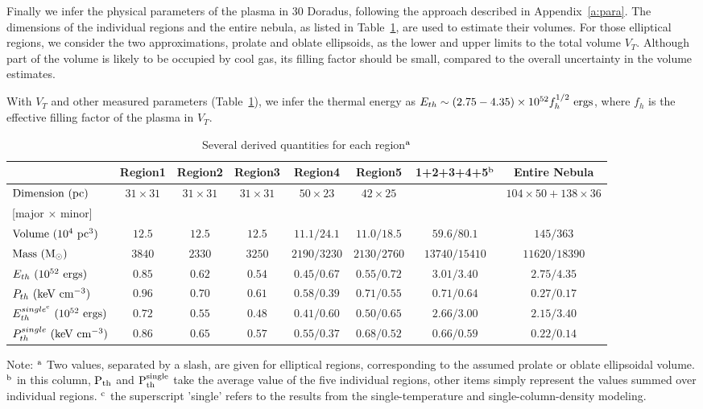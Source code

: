 \documentclass[usenatbib]{mnras}
\def\xs{30 Doradus}
\begin{document}
Finally we infer the physical parameters of the plasma in \xs, following the approach described in Appendix~\ref{a:para}. The dimensions of the individual regions and the entire nebula, as listed in Table~\ref{t:para_derived}, are used to estimate their volumes. For those elliptical regions, we consider the two approximations, prolate and oblate ellipsoids, as the lower and upper limits to the total volume $V_{T}$. Although part of the volume is likely to be occupied by cool gas, its filling factor should be small, compared to the overall uncertainty in the volume estimates. 

With $V_T$ and other measured parameters (Table~\ref{t:para_derived}), we infer the thermal energy as $E_{th} \sim (2.75-4.35) \times 10^{52} f_h^{1/2}
{\rm~ergs}$, where $f_{h}$ is the effective filling factor of the plasma in $V_{T}$. 

\begin{table*}%
\caption{Several derived quantities for each region$^{\rm a}$}
\begin{tabular}{lccccccc}
\hline
 & Region1 & Region2 & Region3 & Region4 & Region5 & 1+2+3+4+5$^{\rm b}$ & Entire Nebula\\
\hline
$\rm{Dimension\ (pc)}$ & $31\times31$ & $31\times31$ & $31\times31$ & $50\times23$ & $42\times25$ && $104\times50 + 138\times36 $\\ 

[major $\times$ minor] & $ $ & $ $ & $ $ & $ $ &$ $\\
$\rm{Volume\ (10^4~pc^3)}$ & $12.5$ & $12.5$ & $12.5$ & $11.1/24.1$ & $11.0/18.5$ & $59.6/80.1$ & $145/363$\\
$\rm{Mass\ (M_{\odot})}$ & $3840$ & $2330$ & $3250$ & $2190/3230$ & $2130/2760$ & $13740/15410$ & $11620/18390$\\
${E_{th}\ \rm(10^{52}~ergs)}$ & $0.85$ & $0.62$ & $0.54$ & $0.45/0.67$ & $0.55/0.72$ & $3.01/3.40$ & $2.75/4.35$\\
${P_{th}\ \rm(keV~cm^{-3})}$ & $0.96$ & $0.70$ & $0.61$ & $0.58/0.39$ & $0.71/0.55$ & $0.71/0.64$ & $0.27/0.17$\\
${E_{th}^{single^{\rm c}}\ \rm(10^{52}~ergs)}$ & $0.72$ & $0.55$ & $0.48$ & $0.41/0.60$ & $0.50/0.65$ & $2.66/3.00$ & $2.15/3.40$\\
${P_{th}^{single}\ \rm(keV~cm^{-3})}$ & $0.86$ & $0.65$ & $0.57$ & $0.55/0.37$ & $0.68/0.52$ & $0.66/0.59$ & $0.22/0.14$\\
\hline
\end{tabular}

Note:  ${}^{\rm a}$ Two values, separated by a slash, are given for elliptical regions, corresponding to the assumed prolate or oblate ellipsoidal volume. ${}^{\rm b}$ in this column, $\rm{P_{th}}$ and $\rm{P_{th}^{single}}$ take the average value of the five individual regions, other items simply represent the values summed over individual regions.
${}^{\rm c}$ the superscript 'single' refers to the results from the single-temperature and single-column-density modeling.
\label{t:para_derived}
\end{table*}
\end{document}
